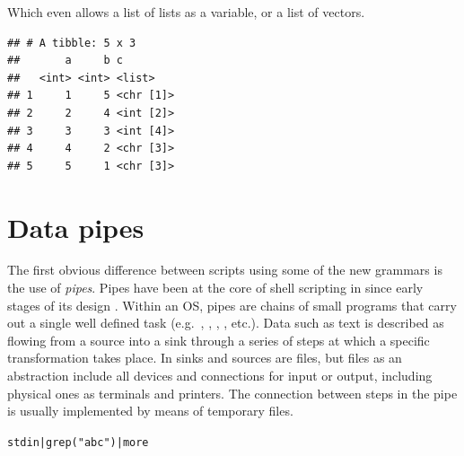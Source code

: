 \documentclass[krantz2]{krantz}\usepackage{knitr}%
\begin{document}
Which even allows a list of lists as a variable, or a list of vectors.
\begin{knitrout}\footnotesize
{}\color{fgcolor}\begin{kframe}
\begin{alltt}
\hlstd{(} \hlstd{=} \hlopt{:}\hlstd{,}  \hlstd{=} \hlopt{:}\hlstd{,}  \hlstd{=} \hlstd{(}\hlstd{,} \hlopt{:}\hlstd{,} \hlopt{:}\hlstd{, letters[}\hlopt{:}\hlstd{], letters[}\hlopt{:}\hlstd{]))}
\end{alltt}
\begin{verbatim}
## # A tibble: 5 x 3
##       a     b c        
##   <int> <int> <list>   
## 1     1     5 <chr [1]>
## 2     2     4 <int [2]>
## 3     3     3 <int [4]>
## 4     4     2 <chr [3]>
## 5     5     1 <chr [3]>
\end{verbatim}
\end{kframe}
\end{knitrout}

\section{Data pipes}

The first obvious difference between scripts using some of the new grammars is the use of \emph{pipes}. Pipes have been at the core of shell scripting in  since early stages of its design \cite{Kernigham1981}. Within an OS, pipes are chains of small programs that carry out a single well defined task (e.g.\ , , , , etc.). Data such as text is described as flowing from a source into a sink through a series of steps at which a specific transformation takes place. In  sinks and sources are files, but files as an abstraction include all devices and connections for input or output, including physical ones as terminals and printers. The connection between steps in the pipe is usually implemented by means of temporary files.

\begin{knitrout}\footnotesize
{}\color{fgcolor}\begin{kframe}
\begin{alltt}
stdin | grep("abc") | more
\end{alltt}
\end{kframe}
\end{knitrout}
\end{document}
